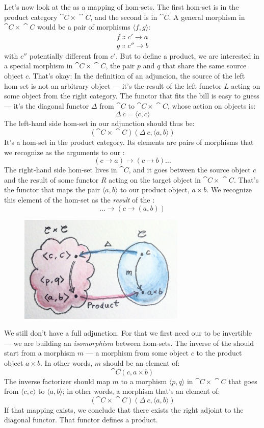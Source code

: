Let's now look at the  as a mapping of hom-sets. The
first hom-set is in the product category $\cat{C}\times{}\cat{C}$, and the second is
in $\cat{C}$. A general morphism in $\cat{C}\times{}\cat{C}$ would be a pair of
morphisms $\langle f, g \rangle$:
\begin{gather*}
f \Colon c' \to a \\
g \Colon c'' \to b
\end{gather*}
with $c''$ potentially different from
$c'$. But to define a product, we are interested in a
special morphism in $\cat{C}\times{}\cat{C}$, the pair $p$ and $q$ that
share the same source object $c$. That's okay: In the definition
of an adjuncion, the source of the left hom-set is not an arbitrary
object --- it's the result of the left functor $L$ acting on some
object from the right category. The functor that fits the bill is easy
to guess --- it's the diagonal functor $\Delta$ from $\cat{C}$ to $\cat{C}\times{}\cat{C}$,
whose action on objects is:
\[\Delta\ c = \langle c, c \rangle\]
The left-hand side hom-set in our adjunction should thus be:
\[(\cat{C}\times{}\cat{C})(\Delta\ c, \langle a, b \rangle)\]
It's a hom-set in the product category. Its elements are pairs of
morphisms that we recognize as the arguments to our :
\[(c \to a) \to (c \to b) \ldots{}\]
The right-hand side hom-set lives in $\cat{C}$, and it goes between the
source object $c$ and the result of some functor $R$
acting on the target object in $\cat{C}\times{}\cat{C}$. That's the functor that maps
the pair $\langle a, b \rangle$ to our product object,
$a\times{}b$. We recognize this element of the hom-set as the
\emph{result} of the :
\[\ldots{} \to (c \to (a, b))\]

\begin{figure}[H]
\centering
\includegraphics[width=3.12500in]{images/adj-product.jpg}
\end{figure}

\noindent
We still don't have a full adjunction. For that we first need our
 to be invertible --- we are building an
\emph{isomorphism} between hom-sets. The inverse of the
 should start from a morphism $m$ --- a
morphism from some object $c$ to the product object $a\times{}b$.
In other words, $m$ should be an element of:
\[\cat{C}(c, a\times{}b)\]
The inverse factorizer should map $m$ to a morphism
$\langle p, q \rangle$ in $\cat{C}\times{}\cat{C}$ that goes from
$\langle c, c \rangle$ to
$\langle a, b \rangle$; in other words, a morphism
that's an element of:
\[(\cat{C}\times{}\cat{C})(\Delta\ c, \langle a, b \rangle)\]
If that mapping exists, we conclude that there exists the right adjoint
to the diagonal functor. That functor defines a product.


